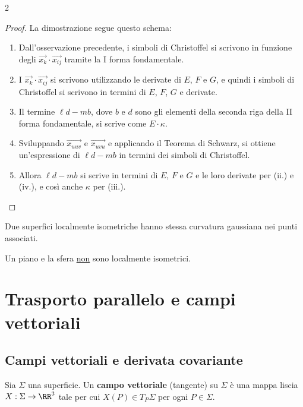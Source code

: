 \begin{multicols*}{2}
    \begin{proof}
        La dimostrazione segue questo schema:
        \begin{enumerate}[(i.)]
            \item Dall'osservazione precedente, i simboli di Christoffel si
                  scrivono in funzione degli $\vec{x_k} \cdot \vec{x_{ij}}$ tramite
                  la I forma fondamentale.
            \item I $\vec{x_k} \cdot \vec{x_{ij}}$ si scrivono utilizzando le derivate
                  di $E$, $F$ e $G$, e quindi i simboli di Christoffel si scrivono
                  in termini di $E$, $F$, $G$ e derivate.
            \item Il termine $\ell d - m b$, dove $b$ e $d$ sono gli elementi della
                  seconda riga della II forma fondamentale, si scrive come $E \cdot \kappa$.
            \item Sviluppando $\vec{x_{uuv}}$ e $\vec{x_{uvu}}$ e applicando il Teorema
                  di Schwarz, si ottiene un'espressione di $\ell d - m b$ in termini dei
                  simboli di Christoffel.
            \item Allora $\ell d - m b$ si scrive in termini di $E$, $F$ e $G$ e le loro derivate
                  per (ii.) e (iv.),
                  e così anche $\kappa$ per (iii.).
        \end{enumerate}
    \end{proof}

    \begin{corollary}
        Due superfici localmente isometriche hanno stessa curvatura gaussiana nei
        punti associati.
    \end{corollary}

    \begin{corollary}
        Un piano e la sfera \underline{non} sono localmente isometrici.
    \end{corollary}

    \section{Trasporto parallelo e campi vettoriali}

    \subsection{Campi vettoriali e derivata covariante}

    \begin{definition}
        Sia $\Sigma$ una superficie. Un \textbf{campo vettoriale} (tangente) su $\Sigma$
        è una mappa liscia $X : \Sigma \to \RR^3$ tale per cui
        $X(P) \in T_P \Sigma$ per ogni $P \in \Sigma$.
    \end{definition}


\end{multicols*}
